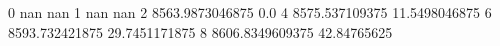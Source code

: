 0 nan nan
1 nan nan
2 8563.9873046875 0.0
4 8575.537109375 11.5498046875
6 8593.732421875 29.7451171875
8 8606.8349609375 42.84765625
